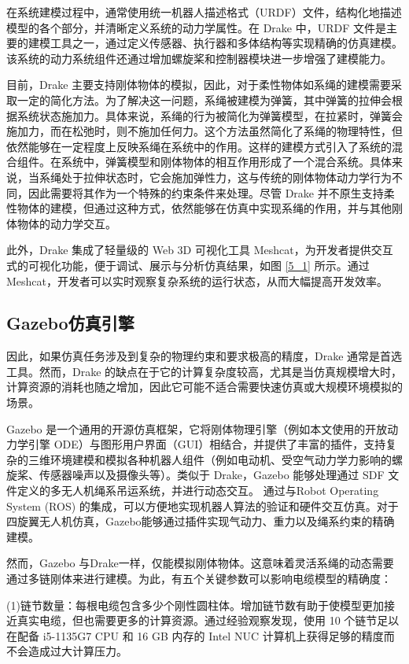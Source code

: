 \documentclass[lang=chs, degree=master, blindreview=false, winfonts=true]{yanputhesis}
\begin{document}
在系统建模过程中，通常使用统一机器人描述格式（URDF）文件，结构化地描述模型的各个部分，并清晰定义系统的动力学属性。在 Drake 中，URDF 文件是主要的建模工具之一，通过定义传感器、执行器和多体结构等实现精确的仿真建模。该系统的动力系统组件还通过增加螺旋桨和控制器模块进一步增强了建模能力。

目前，Drake 主要支持刚体物体的模拟，因此，对于柔性物体如系绳的建模需要采取一定的简化方法。为了解决这一问题，系绳被建模为弹簧，其中弹簧的拉伸会根据系统状态施加力。具体来说，系绳的行为被简化为弹簧模型，在拉紧时，弹簧会施加力，而在松弛时，则不施加任何力。这个方法虽然简化了系绳的物理特性，但依然能够在一定程度上反映系绳在系统中的作用。这样的建模方式引入了系统的混合组件。在系统中，弹簧模型和刚体物体的相互作用形成了一个混合系统。具体来说，当系绳处于拉伸状态时，它会施加弹性力，这与传统的刚体物体动力学行为不同，因此需要将其作为一个特殊的约束条件来处理。尽管 Drake 并不原生支持柔性物体的建模，但通过这种方式，依然能够在仿真中实现系绳的作用，并与其他刚体物体的动力学交互。

此外，Drake 集成了轻量级的 Web 3D 可视化工具 Meshcat，为开发者提供交互式的可视化功能，便于调试、展示与分析仿真结果，如图 \ref{5_1} 所示。通过 Meshcat，开发者可以实时观察复杂系统的运行状态，从而大幅提高开发效率。

\subsection{Gazebo仿真引擎}

因此，如果仿真任务涉及到复杂的物理约束和要求极高的精度，Drake 通常是首选工具。然而，Drake 的缺点在于它的计算复杂度较高，尤其是当仿真规模增大时，计算资源的消耗也随之增加，因此它可能不适合需要快速仿真或大规模环境模拟的场景。

Gazebo 是一个通用的开源仿真框架，它将刚体物理引擎（例如本文使用的开放动力学引擎 ODE）与图形用户界面（GUI）相结合，并提供了丰富的插件，支持复杂的三维环境建模和模拟各种机器人组件（例如电动机、受空气动力学力影响的螺旋桨、传感器噪声以及摄像头等）。类似于 Drake，Gazebo 能够处理通过 SDF 文件定义的多无人机绳系吊运系统，并进行动态交互。
通过与Robot Operating System (ROS) 的集成，可以方便地实现机器人算法的验证和硬件交互仿真。对于四旋翼无人机仿真，Gazebo能够通过插件实现气动力、重力以及绳系约束的精确建模。

然而，Gazebo 与Drake一样，仅能模拟刚体物体。这意味着灵活系绳的动态需要通过多链刚体来进行建模。为此，有五个关键参数可以影响电缆模型的精确度：

(1){链节数量}：每根电缆包含多少个刚性圆柱体。增加链节数有助于使模型更加接近真实电缆，但也需要更多的计算资源。通过经验观察发现，使用 10 个链节足以在配备 i5-1135G7 CPU 和 16 GB 内存的 Intel NUC 计算机上获得足够的精度而不会造成过大计算压力。
    
\end{document}
